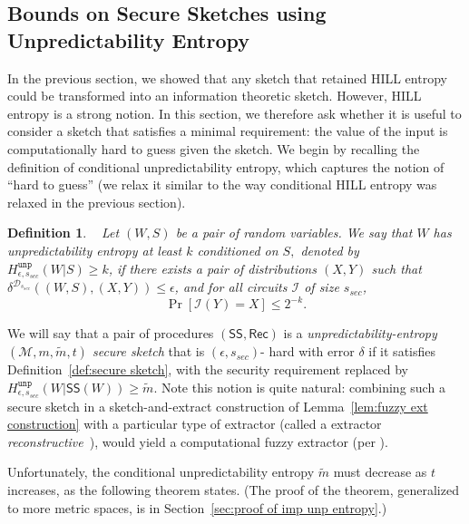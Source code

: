 \documentclass[11pt]{article}
\newcommand{\secref}[1]{\mbox{Section~\ref{#1}}}
\newcommand{\defref}[1]{\mbox{Definition~\ref{#1}}}
\newcommand{\lemref}[1]{\mbox{Lemma~\ref{#1}}}
\newcommand{\class}[1]{{\ensuremath{\mathsf{#1}}}}
\newcommand{\sketch}{\ensuremath{\class{SS}}\xspace}
\newcommand{\rec}{\ensuremath{\class{Rec}}\xspace}
\newcommand{\unp}{\ensuremath{\mathtt{unp}}\xspace}
\newtheorem{definition}[theorem]{Definition}
\begin{document}
\subsection{Bounds on Secure Sketches using Unpredictability Entropy}
\label{sec:imp unp sketch}
In the previous section, we showed that any sketch that retained HILL entropy could be transformed into an information theoretic sketch.  However, HILL entropy is a strong notion.  In this section, we therefore ask whether it is useful to consider a sketch that satisfies a minimal requirement: the value of the input is computationally hard to guess given the sketch.  We begin by recalling the definition of conditional unpredictability entropy, which captures the notion of ``hard to guess'' (we relax it similar to the way conditional HILL entropy was relaxed in the previous section).

\begin{definition}~\cite[Definition 7]{DBLP:conf/eurocrypt/HsiaoLR07}
\label{def:unp entropy}
Let  $(W, S)$ be a pair of random variables. We say that $W$ has \emph{unpredictability entropy} at least $k$ conditioned on $S,$ denoted by $H^{\unp}_{\epsilon, s_{sec}} (W|S) \geq k$, if there exists a pair of distributions $(X, Y)$ such that $\delta^{\mathcal{D}_{s_{sec}}}((W, S),(X, Y))\leq \epsilon$, and for all circuits $\mathcal{I}$ of size $s_{sec}$,
\[
\Pr[\mathcal{I}(Y) = X ] \leq 2^{-k}
.\]
\end{definition}

We will say that a pair of procedures $(\sketch, \rec)$ is a \emph{unpredictability-entropy $(\mathcal{M}, m, \tilde{m}, t)$ secure sketch} that is $(\epsilon, s_{sec})$-
hard with error $\delta$ if it satisfies \defref{def:secure sketch}, with the security requirement replaced by $H^{\unp}_{\epsilon, s_{sec}}(W| \sketch(W))\geq \tilde{m}$.  
Note this notion is quite natural: combining such a secure sketch in a sketch-and-extract construction of  \lemref{lem:fuzzy ext construction} with a particular type of extractor (called a extractor 
\emph{reconstructive}~\cite{barak-computational}), would yield a computational fuzzy extractor (per \cite[Lemma 6]{DBLP:conf/eurocrypt/HsiaoLR07}).  

Unfortunately, the conditional unpredictability entropy $\tilde{m}$ must decrease as $t$ increases, as the following theorem states.  (The proof of the theorem, generalized to more metric spaces, is in \secref{sec:proof of imp unp entropy}.)
\end{document}
